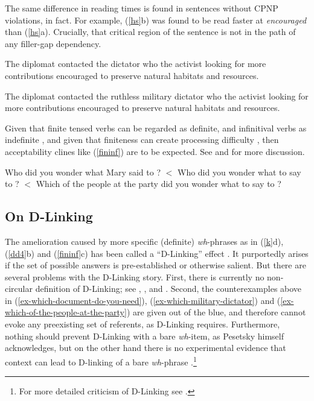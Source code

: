 \documentclass[output=paper
 	        ,biblatex
                ,babelshorthands
                ,newtxmath
                ,draftmode
                ,colorlinks, citecolor=brown
]{langscibook}
\begin{document}
\eal
\label{dd4}
\zl



\noindent
The same difference in reading times is found in sentences without CPNP violations, in fact. For
example, (\ref{hs}b) was found to be read faster at \emph{encouraged} than (\ref{hs}a). Crucially,
that critical region of the sentence is not in the path of any filler-gap dependency.
 
\ealnoraggedright \label{hs}
\ex The diplomat contacted the dictator who the activist looking for more contributions encouraged to preserve natural habitats and resources.
 
\ex The diplomat contacted the ruthless military dictator who the activist looking for more contributions encouraged to preserve natural habitats and resources.
\zl


Given that finite tensed verbs can be regarded as definite, and infinitival verbs as indefinite
\citep{partee84}, and given that finiteness can create processing difficulty
\citep{kluender92,gibson0000}, then acceptability clines like (\ref{fininf}) are to be expected. See
\citet[Chapter 5]{levhubook} and \citet[308]{levine17} for more discussion.

\eal \label{fininf}
\ex Who did you wonder what Mary said to \spc?  $<$
\ex Who did you wonder what to say to \spc?  $<$
\ex\label{ex-which-of-the-people-at-the-party} 
Which of the people at the party did you wonder what to say to \spc? 
\zl

\subsection{On D-Linking}

The amelioration caused by more specific (definite) \emph{wh}-phrases as in (\ref{k}d), (\ref{dd4}b)
and (\ref{fininf}c) has been called a ``D-Linking'' effect \citep{pesetskydlink,pesetskybook}. It
purportedly arises if the set of possible answers is pre-established or otherwise salient. But there
are several problems with the D-Linking story.  First, there is currently no non-circular definition
of D-Linking; see \citet[16]{pesetskybook}, \citet[247--250]{ginzsag}, \citet[33, 39]{chung94} and
\citet[242, 268--271]{levhubook}. Second, the counterexamples above in (\ref{ex-which-document-do-you-need}), (\ref{ex-which-military-dictator}) and (\ref{ex-which-of-the-people-at-the-party}) are given out of the blue, and
therefore cannot evoke any preexisting set of referents, as D-Linking requires.  Furthermore,
nothing should prevent D-Linking with a bare \emph{wh}-item, as Pesetsky himself acknowledges, but
on the other hand there is no experimental evidence that context can lead to D-linking of a bare
\emph{wh}-phrase \citep{sprousediss07,villata}.\footnote{For more detailed criticism of D-Linking
  see \citet{hof2007}.}
\end{document}
